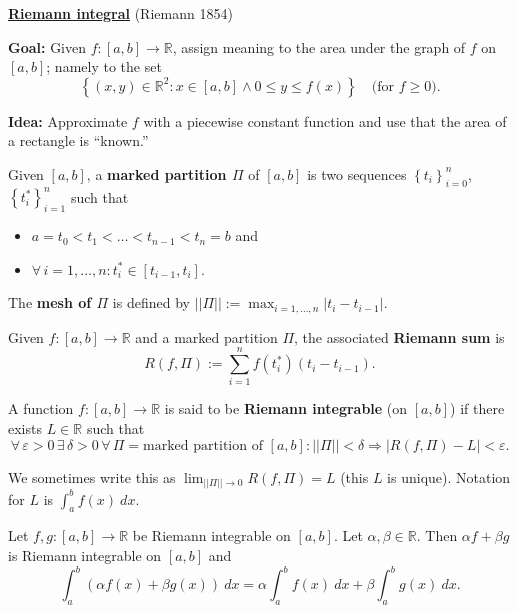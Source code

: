 \documentclass{notes}
\begin{document}
{\boldmath \bfseries \underline{Riemann integral}} (Riemann 1854)

{\boldmath \bfseries Goal:} Given $f \colon [a, b] \to \mathbb R$, assign meaning to the area under the graph of $f$ on $[a, b]$; namely to the set 
\[
  \left \{ (x, y) \in \mathbb R^2 : x \in [a, b] \land 0 \leq y \leq f(x) \right \} \quad \text{(for $f \geq 0$)}.
\]

{\boldmath \bfseries Idea:} Approximate $f$ with a piecewise constant function and use that the area of a rectangle is ``known.''

\begin{defn}
  Given $[a, b]$, a {\boldmath \bfseries marked partition $\Pi$} of $[a, b]$ is two sequences $\left \{ t_i \right \}_{i = 0}^n$, $\left \{ t^*_i \right \}_{i = 1}^n$ such that 
  \begin{itemize}
    \item $a = t_0 < t_1 < \dots < t_{n - 1} < t_n = b$ and 

    \item $\forall \, i = 1, \dots, n: t^*_i \in [t_{i - 1}, t_i]$.
  \end{itemize}
\end{defn}

\begin{defn}
  The {\boldmath \bfseries mesh of $\Pi$} is defined by $|| \Pi || := \max_{i = 1, \dots, n} \left | t_i - t_{i - 1} \right |$.
\end{defn}

\begin{defn}
  Given $f \colon [a, b] \to \mathbb R$ and a marked partition $\Pi$, the associated {\boldmath \bfseries Riemann sum} is 
  \[
    R(f, \Pi) := \sum_{i = 1}^n f(t^*_i) (t_i - t_{i - 1}).
  \]
\end{defn}

\begin{defn}
  A function $f \colon [a, b] \to \mathbb R$ is said to be {\boldmath \bfseries Riemann integrable} (on $[a, b]$) if there exists $L \in \mathbb R$ such that 
  \[
    \forall \, \varepsilon > 0 \, \exists \, \delta > 0 \, \forall \, \Pi = \text{marked partition of $[a, b]$}: || \Pi || < \delta \Rightarrow \left | R(f, \Pi) - L \right | < \varepsilon.
  \]
  
  We sometimes write this as $\lim_{|| \Pi || \to 0} R(f, \Pi) = L$ (this $L$ is unique).
  Notation for $L$ is $\int_a^b f(x)\ dx$.
\end{defn}

\begin{lem}
  Let $f, g \colon [a, b] \to \mathbb R$ be Riemann integrable on $[a, b]$.
  Let $\alpha, \beta \in \mathbb R$.
  Then $\alpha f + \beta g$ is Riemann integrable on $[a, b]$ and 
  \[
    \int_a^b (\alpha f(x) + \beta g(x))\ dx = \alpha \int_a^b f(x)\ dx + \beta \int_a^b g(x)\ dx.
  \]
\end{lem}
\end{document}
